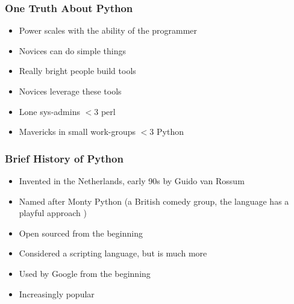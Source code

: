 \begin{frame}[fragile]\frametitle{One Truth About Python}
    \begin{itemize}
    \item Power scales with the ability of the programmer
    \item Novices can do simple things
    \item Really bright people build tools
    \item Novices leverage these tools
    \item Lone sys-admins $<$3 perl
    \item Mavericks in small work-groups $<$3 Python
    \end{itemize}
\end{frame}


\begin{frame}[fragile]\frametitle{Brief History of Python}
    \begin{itemize}
    \item Invented in the Netherlands, early 90s by Guido van Rossum
    \item Named after Monty Python (a British comedy group, the language has a playful approach )
    \item Open sourced from the beginning
    \item Considered a scripting language, but is much more
    \item Used by Google from the beginning
    \item Increasingly popular
    \end{itemize}
\end{frame}
